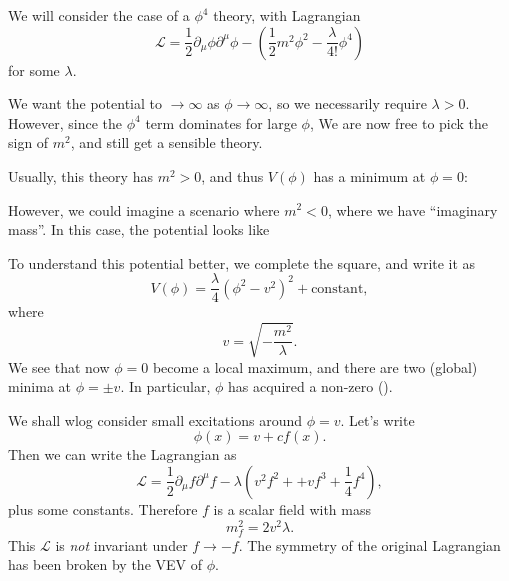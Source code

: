 \documentclass[a4paper]{article}
\begin{document}
We will consider the case of a $\phi^4$ theory, with Lagrangian
\[
  \mathcal{L} = \frac{1}{2} \partial_\mu \phi \partial^\mu \phi - \left(\frac{1}{2} m^2 \phi^2 - \frac{\lambda}{4!} \phi^4\right)
\]
for some $\lambda$.

We want the potential to $\to \infty$ as $\phi \to \infty$, so we necessarily require $\lambda > 0$. However, since the $\phi^4$ term dominates for large $\phi$, We are now free to pick the sign of $m^2$, and still get a sensible theory.

Usually, this theory has $m^2 > 0$, and thus $V(\phi)$ has a minimum at $\phi = 0$:
\begin{center}
\end{center}
However, we could imagine a scenario where $m^2 < 0$, where we have ``imaginary mass''. In this case, the potential looks like
\begin{center}
\end{center}
To understand this potential better, we complete the square, and write it as
\[
  V(\phi) = \frac{\lambda}{4} (\phi^2 - v^2)^2 + \text{constant},
\]
where
\[
  v = \sqrt{-\frac{m^2}{\lambda}}.
\]
We see that now $\phi = 0$ become a local maximum, and there are two (global) minima at $\phi = \pm v$. In particular, $\phi$ has acquired a non-zero  ().

We shall wlog consider small excitations around $\phi = v$. Let's write
\[
  \phi(x) = v + cf(x).
\]
Then we can write the Lagrangian as
\[
  \mathcal{L} = \frac{1}{2} \partial_\mu f \partial^\mu f - \lambda \left(v^2 f^2 + + vf^3 + \frac{1}{4} f^4\right),
\]
plus some constants. Therefore $f$ is a scalar field with mass
\[
  m_f^2 = 2v^2 \lambda.
\]
This $\mathcal{L}$ is \emph{not} invariant under $f \to -f$. The symmetry of the original Lagrangian has been broken by the VEV of $\phi$.
\end{document}
